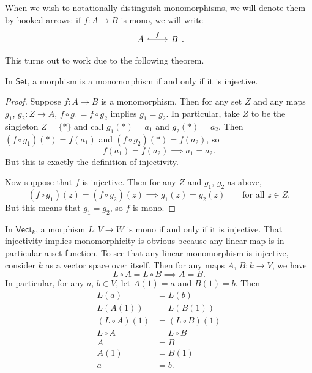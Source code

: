\documentclass[notes.tex]{subfiles}
\begin{document}
\begin{note}
  When we wish to notationally distinguish monomorphisms, we will denote them by hooked arrows: if $f\colon A \to B$ is mono, we will write
  \begin{equation*}
    \begin{tikzcd}
      A
      \arrow[r, hookrightarrow, "f"]
      & B
    \end{tikzcd}.
  \end{equation*}
\end{note}

This turns out to work due to the following theorem.

\begin{theorem}
  In $\mathsf{Set}$, a morphism is a monomorphism if and only if it is injective.
\end{theorem}
\begin{proof}
  Suppose $f\colon A \to B$ is a monomorphism. Then for any set $Z$ and any maps $g_{1}$, $g_{2}\colon Z \to A$, $f \circ g_{1} = f \circ g_{2}$ implies $g_{1} = g_{2}$. In particular, take $Z$ to be the singleton $Z = \{*\}$ and call $g_{1}(*) = a_{1}$ and $g_{2}(*) = a_{2}$. Then $(f \circ g_{1})(*) = f(a_{1})$ and $(f \circ g_{2})(*) = f(a_{2})$, so
  \begin{equation*}
    f(a_{1}) = f(a_{2}) \implies a_{1} = a_{2}.
  \end{equation*}
  But this is exactly the definition of injectivity.

  Now suppose that $f$ is injective. Then for any $Z$ and $g_{1}$, $g_{2}$ as above,
  \begin{equation*}
    (f \circ g_{1})(z) = (f \circ g_{2})(z) \implies g_{1}(z) = g_{2}(z)\qquad\text{for all } z \in Z.
  \end{equation*}
  But this means that $g_{1} = g_{2}$, so $f$ is mono.
\end{proof}

\begin{example}
  \label{eg:monomorphismsinkvect}
  In $\mathsf{Vect}_{k}$, a morphism $L\colon V \to W$ is mono if and only if it is injective. That injectivity implies monomorphicity is obvious because any linear map is in particular a set function. To see that any linear monomorphism is injective, consider $k$ as a vector space over itself. Then for any maps $A$, $B\colon k \to V$, we have
  \begin{equation*}
    L \circ A = L \circ B \implies A = B.
  \end{equation*}
  In particular, for any $a$, $b \in V$, let $A(1) = a$ and $B(1) = b$. Then
  \begin{align*}
    L(a) &= L(b) \\
    L(A(1)) &= L(B(1)) \\
    (L \circ A)(1) &= (L \circ B)(1) \\
    L \circ A &= L \circ B \\
    A &= B \\
    A(1) &= B(1) \\
    a &= b.
  \end{align*}
\end{example}
\end{document}
